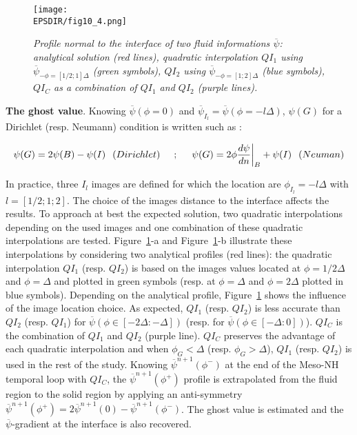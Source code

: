 \begin{figure}[!ht]
\begin{center}
	 \texttt{[image: \\EPSDIR/fig10\_4.png]}
	\small \caption {{\it Profile normal to the interface of two fluid informations $\overline{\psi}$: analytical solution (red lines), quadratic interpolation $QI_1$ using $\overline{\psi}_{-\phi=[1/2;1]\Delta}$ (green symbols), $QI_2$ using $\overline{\psi}_{-\phi=[1;2]\Delta}$ (blue symbols), $QI_C$ as a combination of $QI_1$ and $QI_2$ (purple lines).}}
\label{combination}
\end{center}
\end{figure}

{\bf The ghost value}. Knowing $\overline{\psi}(\phi=0)$ and $\overline{\psi}_{I_l}=\overline{\psi}(\phi=-l\Delta)$, $\psi(G)$ for a Dirichlet (resp. Neumann) condition is written such as :

\vspace{-0.25cm}
\begin{equation}
	\psi(G) = 2\psi(B)-\psi(I)                          \hspace{0.25cm} (Dirichlet) \hspace{0.5cm} ; \hspace{0.5cm} 
	\psi(G) = 2\phi\frac{d \psi}{d n}\bigg|_{B}+\psi(I) \hspace{0.25cm}  (Neuman)
\end{equation}	
\vspace{-0.25cm}

In practice, three $I_l$ images are defined for which the location are $\phi_{I_l}=-l\Delta$ with $l=[1/2;1;2]$. The choice of the images distance to the interface affects the results. To approach at best the expected solution, two quadratic interpolations depending on the used images and one combination of these quadratic interpolations are tested. Figure~\ref{combination}-a and Figure~\ref{combination}-b illustrate these interpolations by considering two analytical profiles (red lines): the quadratic interpolation $QI_1$ (resp. $QI_2$) is based on the images values located at $\phi=1/2\Delta$ and $\phi=\Delta$ and plotted in green symbols (resp. at $\phi=\Delta$ and $\phi=2\Delta$ plotted in blue symbols). Depending on the analytical profile, Figure~\ref{combination} shows the influence of the image location choice. As expected, $QI_1$ (resp. $QI_2$) is less accurate than $QI_2$ (resp. $QI_1$) for $\overline{\psi}(\phi \in [-2\Delta:-\Delta])$ (resp. for $\overline{\psi}(\phi \in [-\Delta:0])$). $QI_C$ is the combination of $QI_1$ and $QI_2$ (purple line). $QI_C$ preserves the advantage of each quadratic interpolation and when $\phi_G<\Delta$ (resp. $\phi_G>\Delta$), $QI_1$ (resp. $QI_2$) is used in the rest of the study. Knowing $\overline{\psi}^{n+1}(\phi^{-})$ at the end of the Meso-NH temporal loop with $QI_C$, the $\overline{\psi}^{n+1}(\phi^{+})$ profile is extrapolated from the fluid region to the solid region by applying an anti-symmetry $\overline{\psi}^{n+1}(\phi^{+})=2\overline{\psi}^{n+1}(0)-\overline{\psi}^{n+1}(\phi^{-})$. The ghost value is estimated and the $\overline{\psi}$-gradient at the interface is also recovered. 

